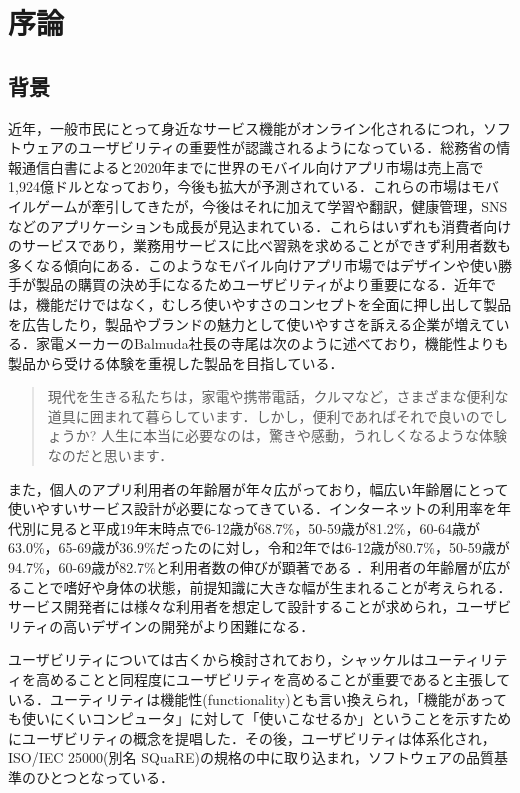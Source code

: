 \chapter{序論}
\label{chap:introduction}

\section{背景}

近年，一般市民にとって身近なサービス機能がオンライン化されるにつれ，ソフトウェアのユーザビリティの重要性が認識されるようになっている\cite{kurosu}．総務省の情報通信白書によると2020年までに世界のモバイル向けアプリ市場は売上高で1,924億ドルとなっており，今後も拡大が予測されている．これらの市場はモバイルゲームが牽引してきたが，今後はそれに加えて学習や翻訳，健康管理，SNSなどのアプリケーションも成長が見込まれている\cite{hakusyo}．これらはいずれも消費者向けのサービスであり，業務用サービスに比べ習熟を求めることができず利用者数も多くなる傾向にある．このようなモバイル向けアプリ市場ではデザインや使い勝手が製品の購買の決め手になるためユーザビリティがより重要になる．近年では，機能だけではなく，むしろ使いやすさのコンセプトを全面に押し出して製品を広告したり，製品やブランドの魅力として使いやすさを訴える企業が増えている\cite{tullis2014}．家電メーカーのBalmuda社長の寺尾は次のように述べており，機能性よりも製品から受ける体験を重視した製品を目指している．\begin{quotation}
  現代を生きる私たちは，家電や携帯電話，クルマなど，さまざまな便利な道具に囲まれて暮らしています．しかし，便利であればそれで良いのでしょうか? 人生に本当に必要なのは，驚きや感動，うれしくなるような体験なのだと思います\cite{terao}．
\end{quotation}


また，個人のアプリ利用者の年齢層が年々広がっており，幅広い年齢層にとって使いやすいサービス設計が必要になってきている．インターネットの利用率を年代別に見ると平成19年末時点で6-12歳が68.7\%，50-59歳が81.2\%，60-64歳が63.0\%，65-69歳が36.9\%だったのに対し，令和2年では6-12歳が80.7\%，50-59歳が94.7\%，60-69歳が82.7\%と利用者数の伸びが顕著である\cite{doukou1}\cite{doukou2} ．利用者の年齢層が広がることで嗜好や身体の状態，前提知識に大きな幅が生まれることが考えられる．サービス開発者には様々な利用者を想定して設計することが求められ，ユーザビリティの高いデザインの開発がより困難になる．

ユーザビリティについては古くから検討されており，シャッケル\cite{shackel1991human}はユーティリティを高めることと同程度にユーザビリティを高めることが重要であると主張している．ユーティリティは機能性(functionality)とも言い換えられ，「機能があっても使いにくいコンピュータ」に対して「使いこなせるか」ということを示すためにユーザビリティの概念を提唱した\cite{kurosu}．その後，ユーザビリティは体系化され，ISO/IEC 25000(別名 SQuaRE)の規格の中に取り込まれ，ソフトウェアの品質基準のひとつとなっている．

